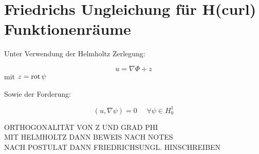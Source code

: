 \newpage
\section{Friedrichs Ungleichung f\"ur H(curl) Funktionenr\"aume}
Unter Verwendung der Helmholtz Zerlegung:
\par
\begin{equation}
	u = \nabla \Phi + z
\end{equation}
mit $z = \mathrm{rot}\,\psi$
\par
Sowie der Forderung:
\par
\begin{equation}
	(u,\nabla\psi) = 0 ~~~~~~\forall \psi\in H^1_0
\end{equation}



ORTHOGONALIT\"AT VON Z UND GRAD PHI\\
MIT HELMHOLTZ DANN BEWEIS NACH NOTES\\
NACH POSTULAT DANN FRIEDRICHSUNGL. HINSCHREIBEN